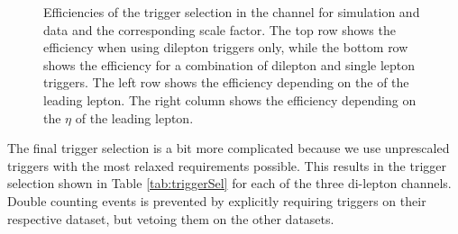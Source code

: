 \begin{figure}[htbp!]
\begin{center}
      \caption{Efficiencies of the trigger selection in the \emu channel for simulation and data and the corresponding scale factor. The top row shows the efficiency when using dilepton triggers only, while the bottom row shows
      the efficiency for a combination of dilepton and single lepton triggers. The left row shows the efficiency depending on the \pt of the leading lepton. The right column shows the efficiency depending on the $\eta$ of the leading lepton. }  
       \label{fig:TriggerSel}
  \end{center}
\end{figure}


The final trigger selection is a bit more complicated because we use unprescaled triggers with the most relaxed requirements possible.
This results in the trigger selection shown in Table \ref{tab:triggerSel} for each of the three di-lepton channels.
Double counting events is prevented by explicitly requiring triggers on their respective dataset, but vetoing them on the other datasets.

